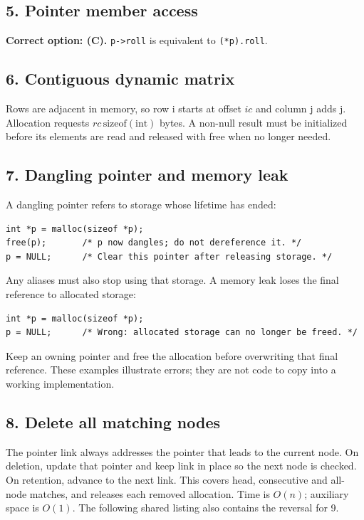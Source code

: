 \documentclass[11pt,a4paper]{article}
\begin{document}
\noindent\begin{minipage}{\linewidth}\subsection*{5. Pointer member access}
\textbf{Correct option: (C).} \texttt{p->roll} is equivalent to \texttt{(*p).roll}.
\end{minipage}\par\medskip
\noindent\begin{minipage}{\linewidth}\subsection*{6. Contiguous dynamic matrix}
Rows are adjacent in memory, so row i starts at offset $ic$ and column j adds j. Allocation requests $rc\,\mathrm{sizeof(int)}$ bytes. A non-null result must be initialized before its elements are read and released with free when no longer needed.
\end{minipage}\par\medskip
\noindent\begin{minipage}{\linewidth}\subsection*{7. Dangling pointer and memory leak}

A dangling pointer refers to storage whose lifetime has ended:
\begin{verbatim}
int *p = malloc(sizeof *p);
free(p);       /* p now dangles; do not dereference it. */
p = NULL;      /* Clear this pointer after releasing storage. */
\end{verbatim}
Any aliases must also stop using that storage. A memory leak loses the final reference to allocated storage:
\begin{verbatim}
int *p = malloc(sizeof *p);
p = NULL;      /* Wrong: allocated storage can no longer be freed. */
\end{verbatim}
Keep an owning pointer and free the allocation before overwriting that final reference. These examples illustrate errors; they are not code to copy into a working implementation.
\end{minipage}\par\medskip
\noindent\begin{minipage}{\linewidth}\subsection*{8. Delete all matching nodes}
The pointer link always addresses the pointer that leads to the current node. On deletion, update that pointer and keep link in place so the next node is checked. On retention, advance to the next link. This covers head, consecutive and all-node matches, and releases each removed allocation. Time is $O(n)$; auxiliary space is $O(1)$. The following shared listing also contains the reversal for 9.

\end{minipage}\par\medskip
\end{document}
